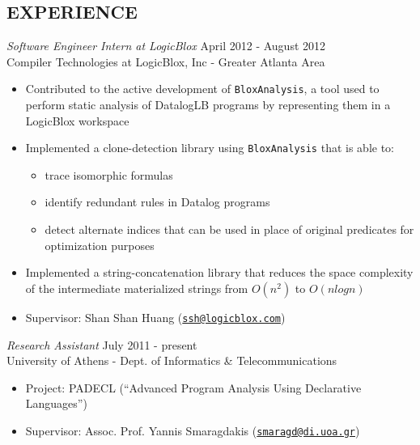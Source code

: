 \documentclass[margin]{res}
\begin{document}
\begin{resume}
\section{EXPERIENCE}

        {\sl Software Engineer Intern at LogicBlox} \hfill April 2012 - August 2012 \\
        Compiler Technologies at LogicBlox, Inc - Greater Atlanta Area
        \begin{itemize}
        \item Contributed to the active development of \texttt{BloxAnalysis},
          a tool used to perform static analysis of DatalogLB programs
          by representing them in a LogicBlox workspace
        \item Implemented a clone-detection library using \texttt{BloxAnalysis}
          that is able to: 
          \begin{itemize} 
          \item trace isomorphic formulas
          \item identify redundant rules in Datalog programs
          \item detect alternate indices that can be used in place of original predicates 
            for optimization purposes
          \end{itemize}
        \item Implemented a string-concatenation library that reduces the space complexity
          of the intermediate materialized strings from $O(n^2)$ to $O(nlogn)$
        \item Supervisor: Shan Shan Huang
          (\href{mailto:ssh@logicblox.com}{\nolinkurl{ssh@logicblox.com}})
        \end{itemize}

        {\sl Research Assistant} \hfill July 2011 - present \\
        University of Athens - Dept. of Informatics \& Telecommunications
        \begin{itemize} \itemsep -2pt %
        \item Project: PADECL (``Advanced Program Analysis Using Declarative Languages'')
        \item Supervisor: Assoc. Prof. Yannis Smaragdakis
          (\href{mailto:smaragd@di.uoa.gr}{\nolinkurl{smaragd@di.uoa.gr}})
        \end{itemize}
        

\end{resume}
\end{document}
